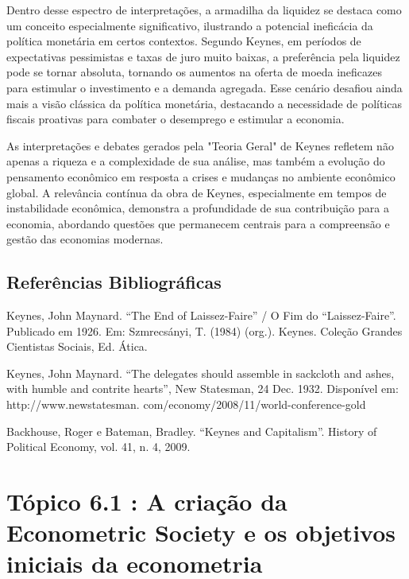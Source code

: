 \documentclass[a4paper,12pt]{article}[abntex2]
\begin{document}
Dentro desse espectro de interpretações, a armadilha da liquidez se destaca como um conceito especialmente significativo, ilustrando a potencial ineficácia da política monetária em certos contextos. Segundo Keynes, em períodos de expectativas pessimistas e taxas de juro muito baixas, a preferência pela liquidez pode se tornar absoluta, tornando os aumentos na oferta de moeda ineficazes para estimular o investimento e a demanda agregada. Esse cenário desafiou ainda mais a visão clássica da política monetária, destacando a necessidade de políticas fiscais proativas para combater o desemprego e estimular a economia.

As interpretações e debates gerados pela "Teoria Geral" de Keynes refletem não apenas a riqueza e a complexidade de sua análise, mas também a evolução do pensamento econômico em resposta a crises e mudanças no ambiente econômico global. A relevância contínua da obra de Keynes, especialmente em tempos de instabilidade econômica, demonstra a profundidade de sua contribuição para a economia, abordando questões que permanecem centrais para a compreensão e gestão das economias modernas.

\subsection{\textbf{Referências Bibliográficas}}
Keynes, John Maynard. “The End of Laissez-Faire” / O Fim do “Laissez-Faire”. Publicado em
1926. Em: Szmrecsányi, T. (1984) (org.). Keynes. Coleção Grandes Cientistas Sociais, Ed.
Ática.

Keynes, John Maynard. “The delegates should assemble in sackcloth and ashes, with humble
and contrite hearts”, New Statesman, 24 Dec. 1932. Disponível em: http://www.newstatesman.
com/economy/2008/11/world-conference-gold

Backhouse, Roger e Bateman, Bradley. “Keynes and Capitalism”. History of Political Economy,
vol. 41, n. 4, 2009.

\newpage
\section{\textbf{Tópico 6.1 : A criação da Econometric Society e os objetivos iniciais da econometria}}
\end{document}
